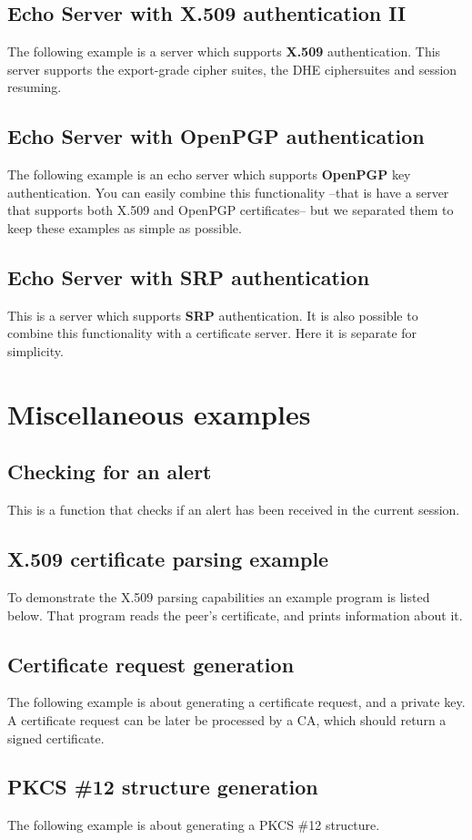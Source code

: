 \subsection{Echo Server with X.509 authentication II}
The following example is a server which supports {\bf X.509} authentication.
This server supports the export-grade cipher suites, the DHE ciphersuites
and session resuming.


\subsection{Echo Server with OpenPGP authentication}
The following example is an echo server which supports {\bf OpenPGP} key 
authentication. You can easily combine this functionality --that is have
a server that supports both X.509 and OpenPGP certificates-- but we
separated them to keep these examples as simple as possible.



\subsection{Echo Server with SRP authentication}
This is a server which supports {\bf SRP} authentication. It is also
possible to combine this functionality with a certificate server. Here it
is separate for simplicity.


\section{Miscellaneous examples}

\subsection{Checking for an alert}
This is a function that checks if an alert has been received
in the current session.


\subsection{X.509 certificate parsing example}
\label{ex:x509-info}
To demonstrate the X.509 parsing capabilities an example program is listed below.
That program reads the peer's certificate, and prints information about it.


\subsection{Certificate request generation}
\label{ex:crq}
The following example is about generating a certificate request, and
a private key. A certificate request can be later be processed by a CA,
which should return a signed certificate.



\subsection{PKCS \#12 structure generation}
\label{ex:pkcs12}
The following example is about generating a PKCS \#12 structure.







